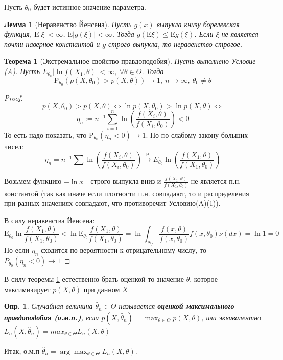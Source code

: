 \documentclass[12pt]{article}
\newtheorem{definition}{Опр.}
\newtheorem{lemma}{Лемма}
\theoremstyle{basic_theorem}
\newtheorem{theorem}{Теорема}
\theoremstyle{name_theorem}
\newcommand\defin[1]{\textbf{#1}}
\def\E{
    \mathrm{E}
}
\def\P{
    \mathrm{P}
}
\begin{document}
    Пусть $\theta_0$ будет истинное значение параметра.
    \begin{lemma}[Неравенство Йенсена]
        Пусть $g(x)$ выпукла книзу борелевская функция, $\E\left\lvert \xi \right\rvert  <\infty$,
        $\E\left\lvert g(\xi) \right\rvert  <\infty$. Тогда $g(\E\xi) \leq \E g(\xi)$. Если $\xi$
        не является почти наверное константой и $g$ строго выпукла, то неравенство строгое.
    \end{lemma}
    \begin{theorem}[Экстремальное свойство правдоподобия]
        \label{th::extr_plausibility}
        Пусть выполнено Условие (A). Пусть $E_{\theta_0} \left\lvert \ln f(X_1, \theta) \right\rvert  < \infty,\ \forall \theta \in \Theta$.
        Тогда 
        $$\P_{\theta_0}(p(X, \theta_0) > p(X, \theta)) \rightarrow 1,\ n\rightarrow \infty,\ \theta_0 \neq \theta$$
    \end{theorem}
    \begin{proof}
        $$p(X, \theta_0) > p(X, \theta) \Leftrightarrow \ln p(X, \theta_0) > \ln p(X, \theta) \Leftrightarrow$$
        $$\eta_n := n^{-1} \sum_{i=1}^n \ln \left(\frac{f(X_i, \theta)}{f(X_i, \theta_0)}\right) < 0$$
    То есть надо показать, что $\P_{\theta_0}(\eta_n < 0) \rightarrow 1$. Но по слабому закону больших чисел:
    $$\eta_n = n^{-1}\sum \ln \left(\frac{f(X_i, \theta)}{f(X_i, \theta_0)} \right) \xrightarrow{\P}
    E_{\theta_0}\ln \left(\frac{f(X_1, \theta)}{f(X_1, \theta_0)} \right) $$

    Возьмем функцию $-\ln x$ - строго выпукла вниз и $\frac{f(X_1, \theta)}{f(X_1, \theta_0)}$
    не является п.н. константой (так как иначе если плотности п.н. совпадают,
    то и распределения при разных значениях совпадают, что противоречит Условию(A)(1)). 

    В силу неравенства Йенсена:
    $$\E_{\theta_0} \ln \frac{f(X_1, \theta)}{f(X_1, \theta_0)} < \ln \E_{\theta_0} \frac{f(X_1, \theta)}{f(X_1, \theta_0)} = \ln \int_{N_f} \frac{f(x, \theta)}{f(x, \theta_0)} f(x, \theta_0) \nu(dx) = \ln1 = 0$$
    Но если $\eta_n$ сходится по вероятности к отрицательному числу, то $P_{\theta_0}(\eta_n < 0) \rightarrow 1$
\end{proof}
    В силу теоремы \ref{th::extr_plausibility} естественно брать
    оценкой то значение $\theta$, которое максимизирует $p(X, \theta)$ при данном $X$

    \begin{definition}
        Случайная величина $\widehat{\theta}_n \in \Theta$ называется
        \defin{оценкой максимального правдоподобия (о.м.п.)}, если
        $p(X, \widehat{\theta}_n) = \max_{\theta\in\Theta} p(X, \theta)$,
        или эквивалентно $L_n(X, \widehat{\theta}_n) = max_{\theta\in\Theta} L_n(X, \theta)$
    \end{definition}
    Итак, о.м.п $\widehat{\theta}_n = \arg\max_{\theta\in\Theta} L_n(X, \theta)$.
    
\end{document}
